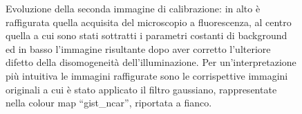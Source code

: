 \begin{figure}
 \caption{\small{Evoluzione della seconda immagine di calibrazione: in alto è raffigurata quella acquisita del microscopio a fluorescenza, al centro quella a cui sono stati sottratti i parametri costanti di background ed in basso l'immagine risultante dopo aver corretto l'ulteriore difetto della disomogeneità dell'illuminazione. Per un'interpretazione più intuitiva le immagini raffigurate sono le corrispettive immagini originali a cui è stato applicato il filtro gaussiano, rappresentate nella colour map ``gist\_ncar'', riportata a fianco.}}
 \label{fig:cmap}
\end{figure}